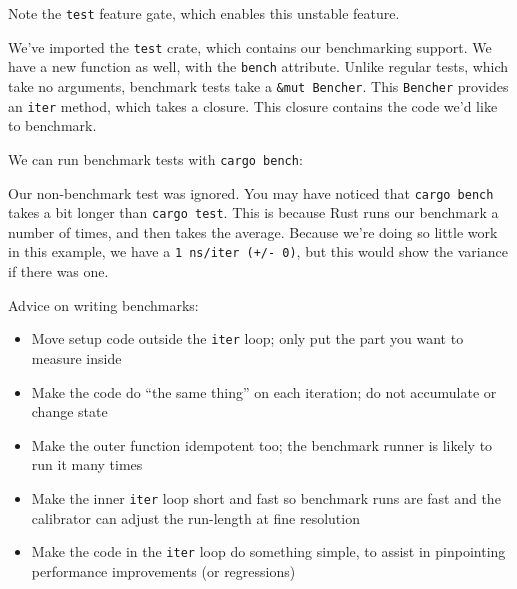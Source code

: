 \documentclass[a4paper,]{book}
\newenvironment{Shaded}{\begin{snugshade}}{\end{snugshade}}
\newcommand{\KeywordTok}[1]{\textcolor[rgb]{0.13,0.29,0.53}{\textbf{{#1}}}}
\newcommand{\NormalTok}[1]{{#1}}
\begin{document}
Note the \texttt{test} feature gate, which enables this unstable
feature.

We've imported the \texttt{test} crate, which contains our benchmarking
support. We have a new function as well, with the \texttt{bench}
attribute. Unlike regular tests, which take no arguments, benchmark
tests take a \texttt{\&mut\ Bencher}. This \texttt{Bencher} provides an
\texttt{iter} method, which takes a closure. This closure contains the
code we'd like to benchmark.

We can run benchmark tests with \texttt{cargo\ bench}:

\begin{Shaded}
\end{Shaded}

Our non-benchmark test was ignored. You may have noticed that
\texttt{cargo\ bench} takes a bit longer than \texttt{cargo\ test}. This
is because Rust runs our benchmark a number of times, and then takes the
average. Because we're doing so little work in this example, we have a
\texttt{1\ ns/iter\ (+/-\ 0)}, but this would show the variance if there
was one.

Advice on writing benchmarks:

\begin{itemize}
\itemsep1pt\parskip0pt
\item
  Move setup code outside the \texttt{iter} loop; only put the part you
  want to measure inside
\item
  Make the code do ``the same thing'' on each iteration; do not
  accumulate or change state
\item
  Make the outer function idempotent too; the benchmark runner is likely
  to run it many times
\item
  Make the inner \texttt{iter} loop short and fast so benchmark runs are
  fast and the calibrator can adjust the run-length at fine resolution
\item
  Make the code in the \texttt{iter} loop do something simple, to assist
  in pinpointing performance improvements (or regressions)
\end{itemize}
\end{document}
